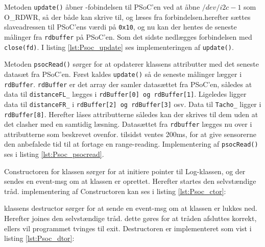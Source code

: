 Metoden \texttt{update()} åbner \IIC-fobindelsen til PSoC'en ved at åbne $/dev/i2c-1$ som O\_RDWR, så der både kan skrive til, og læses fra forbindelsen.herefter sættes slaveadressen til PSoC'ens værdi på \texttt{0x10}, og nu kan der hentes de seneste målinger fra \texttt{rdbuffer} på PSoC'en. Som det sidste nedlægges forbindelsen med \texttt{close(fd)}. I listing \ref{lst:Psoc_update} ses implementeringen af \texttt{update()}.



Metoden \texttt{psocRead()} sørger for at opdaterer klassens attributter med det seneste datasæt fra PSoC'en. 
Først kaldes \texttt{update()} så de seneste målinger lægger i \texttt{rdBuffer}. 
\texttt{rdBuffer} er det array der samler datasættet fra PSoC'en, således at data til \texttt{distanceFL\_} lægges i \texttt{rdBuffer[0] og rdBuffer[1]}. 
Ligeledes ligger data til \texttt{distanceFR\_} i \texttt{rdBuffer[2] og rdBuffer[3]} osv. Data til \texttt{Tacho\_} ligger i \texttt{rdBuffer[8]}. Herefter låses attributterne således kan der skrives til dem uden at det clasher med en samtidig læsning. 
Datasættet fra \texttt{rdbuffer} lægges nu over i attributterne som beskrevet ovenfor. tilsidst ventes 200ms, for at give sensorerne den anbefalede tid til at fortage en range-reading. 
Implementering af \texttt{psocRead()} ses i listing \ref{lst:Psoc_psocread}.



Constructoren for klassen sørger for at initiere pointer til Log-klassen, og der sendes en event-msg om at klassen er oprettet. Herefter startes den selvstændige tråd. implementering af Constructoren kan ses i listing \ref{lst:Psoc_ctor}:




klassens destructor sørger for at sende en event-msg om at klassen er lukkes ned. Herefter joines den selvstændige tråd. dette gøres for at tråden afsluttes korrekt, ellers vil programmet tvinges til exit. Destructoren er implementeret som vist i listing \ref{lst:Psoc_dtor}:

